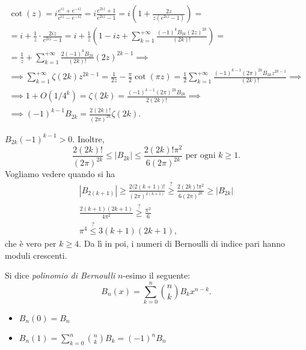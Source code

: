 \begin{oss}
  \begin{gather*}
    \cot(z)=i\frac{e^{iz}+e^{-iz}}{e^{iz}-e^{-iz}}=i\frac{e^{2iz}+1}{e^{2iz}-1}=i\left(1+\frac{2z}{z(e^{2iz}-1)}\right)= \\
    =i+\frac{1}{z}\cdot\frac{2iz}{e^{2iz}-1}=i+\frac{1}{z}\left(1-iz+\sum_{k=1}^{+\infty}\frac{(-1)^kB_{2k}(2z)^{2k}}{(2k)!}\right)= \\
    =\frac{1}{z}+\sum_{k=1}^{+\infty}\frac{2(-1)^kB_{2k}}{(2k)!}(2z)^{2k-1} \implies \\
    \implies \sum_{k=1}^{+\infty}\zeta(2k)z^{2k-1}=\frac{1}{2z}-\frac{\pi}{2}\cot(\pi z)=\frac{1}{2}\sum_{k=1}^{+\infty} \frac{(-1)^{k-1}(2\pi)^{2k}B_{2k}z^{2k-1}}{(2k)!} \implies \\
    \implies 1+O(1/4^k)=\zeta(2k)=\frac{(-1)^{k-1}(2\pi)^{2k}B_{2k}}{2(2k)!} \implies \\
    \implies (-1)^{k-1}B_{2k}=\frac{2(2k)!}{(2\pi)^{2k}}\zeta(2k).
  \end{gather*}
\end{oss}

\begin{oss}
  $B_{2k}(-1)^{k-1}>0$. Inoltre,
  $$\frac{2(2k)!}{(2\pi)^{2k}} \le |B_{2k}| \le \frac{2(2k)!\pi^2}{6(2\pi)^{2k}} \text{ per ogni } k \ge 1.$$
  Vogliamo vedere quando si ha
  \begin{gather*}
    |B_{2(k+1)}| \ge \frac{2\big(2(k+1)\big)!}{(2\pi)^{2(k+1)}} \stackrel{?}{\ge} \frac{2(2k)!\pi^2}{6(2\pi)^{2k}} \ge |B_{2k}| \\
    \frac{2(k+1)(2k+1)}{4\pi^2} \stackrel{?}{\ge} \frac{\pi^2}{6} \\
    \pi^4 \stackrel{?}{\le} 3(k+1)(2k+1),
  \end{gather*}
  che è vero per $k \ge 4$. Da lì in poi, i numeri di Bernoulli di indice pari hanno moduli crescenti.
\end{oss}

\begin{defn}
  Si dice \textit{polinomio di Bernoulli} $n$-esimo il seguente:
  $$B_n(x)=\sum_{k=0}^n \binom{n}{k}B_kx^{n-k}.$$
\end{defn}

\begin{ftt}
  \begin{itemize}
    \item $B_n(0)=B_n$
    \item $\displaystyle B_n(1)=\sum_{k=0}^n \binom{n}{k}B_k=(-1)^nB_n$
  \end{itemize}
\end{ftt}

